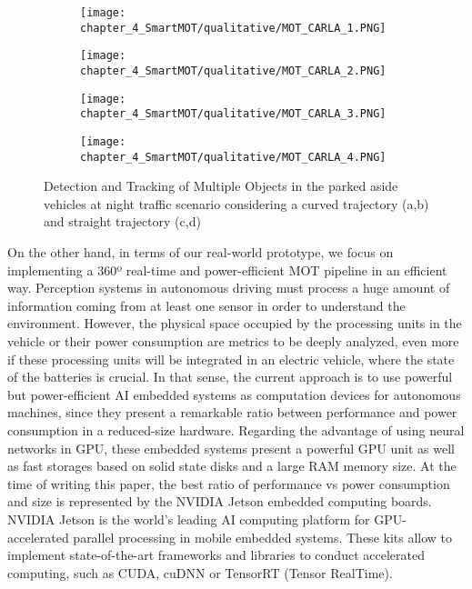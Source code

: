 \begin{figure}[h]
	\centering
	\begin{subfigure}{0.24\textwidth}
		\captionsetup{justification=centering}
		\texttt{[image: chapter\_4\_SmartMOT/qualitative/MOT\_CARLA\_1.PNG]}
		\caption{}
	\end{subfigure}
	\hfill
	\begin{subfigure}{0.24\textwidth}
		\captionsetup{justification=centering}
		\texttt{[image: chapter\_4\_SmartMOT/qualitative/MOT\_CARLA\_2.PNG]}
		\caption{}
	\end{subfigure}
	\hfill
	\begin{subfigure}{0.24\textwidth}
		\captionsetup{justification=centering}
		\texttt{[image: chapter\_4\_SmartMOT/qualitative/MOT\_CARLA\_3.PNG]}
		\caption{}
	\end{subfigure}
	\hfill
	\begin{subfigure}{0.24\textwidth}
		\captionsetup{justification=centering}
		\texttt{[image: chapter\_4\_SmartMOT/qualitative/MOT\_CARLA\_4.PNG]}
		\caption{}
	\end{subfigure}
	\caption[Detection and Tracking of Multiple Objects in the CARLA simulator]{Detection and Tracking of Multiple Objects in the parked aside vehicles at night traffic scenario considering a curved trajectory (a,b) and straight trajectory (c,d)}
	\label{fig:chapter_4_SmartMOT/MOT_CARLA}
\end{figure}

On the other hand, in terms of our real-world prototype, we focus on implementing a 360º real-time and power-efficient \ac{MOT} pipeline in an efficient way. Perception systems in autonomous driving must process a huge amount of information coming from at least one sensor in order to understand the environment. However, the physical space occupied by the processing units in the vehicle or their power consumption are metrics to be deeply analyzed, even more if these processing units will be integrated in an electric vehicle, where the state of the batteries is crucial. In that sense, the current approach is to use powerful but power-efficient \ac{AI} embedded systems as computation devices for autonomous machines, since they present a remarkable ratio between performance and power consumption in a reduced-size hardware. Regarding the advantage of using neural networks in GPU, these embedded systems present a powerful GPU unit as well as fast storages based on solid state disks and a large RAM memory size. At the time of writing this paper, the best ratio of performance vs power consumption and size is represented by the NVIDIA Jetson embedded computing boards. NVIDIA Jetson is the world's leading AI computing platform for GPU-accelerated parallel processing in mobile embedded systems. These kits allow to implement state-of-the-art frameworks and libraries to conduct accelerated computing, such as CUDA, cuDNN or TensorRT (Tensor RealTime). 

